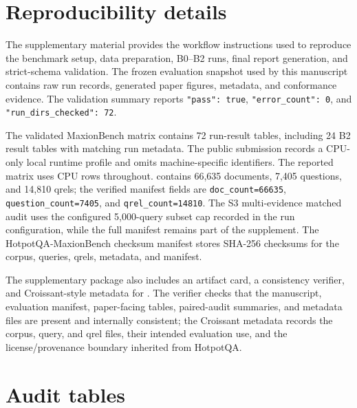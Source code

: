 \section{Reproducibility details}
\suppressfloats[t]

The supplementary material provides the workflow instructions used to reproduce the benchmark setup, data preparation, B0--B2 runs, final report generation, and strict-schema validation. The frozen evaluation snapshot used by this manuscript contains raw run records, generated paper figures, \hotpotmaxionbench{} metadata, and conformance evidence. The validation summary reports \texttt{"pass": true}, \texttt{"error\_count": 0}, and \texttt{"run\_dirs\_checked": 72}.

The validated MaxionBench matrix contains 72 run-result tables, including 24 B2 result tables with matching run metadata. The public submission records a CPU-only local runtime profile and omits machine-specific identifiers. The reported matrix uses CPU rows throughout. \hotpotmaxionbench{} contains 66{,}635 documents, 7{,}405 questions, and 14{,}810 qrels; the verified manifest fields are \texttt{doc\_count=66635}, \texttt{question\_count=7405}, and \texttt{qrel\_count=14810}. The S3 multi-evidence matched audit uses the configured 5{,}000-query subset cap recorded in the run configuration, while the full \hotpotmaxionbench{} manifest remains part of the supplement. The HotpotQA-MaxionBench checksum manifest stores SHA-256 checksums for the corpus, queries, qrels, metadata, and manifest.

The supplementary package also includes an artifact card, a consistency verifier, and Croissant-style metadata for \hotpotmaxionbench{}. The verifier checks that the manuscript, evaluation manifest, paper-facing tables, paired-audit summaries, and metadata files are present and internally consistent; the Croissant metadata records the corpus, query, and qrel files, their intended evaluation use, and the license/provenance boundary inherited from HotpotQA.

\section{Audit tables}
\suppressfloats[t]

